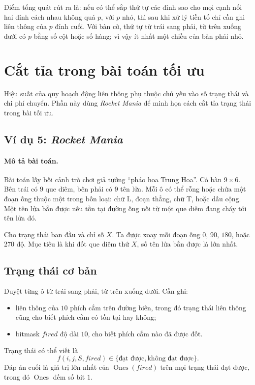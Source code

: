 \documentclass[11pt]{article}
\begin{document}
Điểm tổng quát rút ra là: nếu có thể sắp thứ tự các đỉnh sao cho mọi cạnh nối
hai đỉnh cách nhau không quá \(p\), với \(p\) nhỏ, thì sau khi xử lý tiền tố
chỉ cần ghi liên thông của \(p\) đỉnh cuối. Với bàn cờ, thứ tự từ trái sang
phải, từ trên xuống dưới có \(p\) bằng số cột hoặc số hàng; vì vậy ít nhất một
chiều của bàn phải nhỏ.

\section{Cắt tỉa trong bài toán tối ưu}

Hiệu suất của quy hoạch động liên thông phụ thuộc chủ yếu vào số trạng thái và
chi phí chuyển. Phần này dùng \textit{Rocket Mania} để minh họa cách cắt tỉa
trạng thái trong bài tối ưu.

\subsection{Ví dụ 5: \textit{Rocket Mania}}

\paragraph{Mô tả bài toán.}
Bài toán lấy bối cảnh trò chơi giả tưởng ``pháo hoa Trung Hoa''. Có bàn
\(9\times6\). Bên trái có \(9\) que diêm, bên phải có \(9\) tên lửa. Mỗi ô có
thể rỗng hoặc chứa một đoạn ống thuộc một trong bốn loại: chữ L, đoạn thẳng,
chữ T, hoặc dấu cộng. Một tên lửa bắn được nếu tồn tại đường ống nối từ một
que diêm đang cháy tới tên lửa đó.

Cho trạng thái ban đầu và chỉ số \(X\). Ta được xoay mỗi đoạn ống \(0\),
\(90\), \(180\), hoặc \(270\) độ. Mục tiêu là khi đốt que diêm thứ \(X\), số
tên lửa bắn được là lớn nhất.

\subsection{Trạng thái cơ bản}

Duyệt từng ô từ trái sang phải, từ trên xuống dưới. Cần ghi:
\begin{itemize}
  \item liên thông của \(10\) phích cắm trên đường biên, trong đó trạng thái
  liên thông cũng cho biết phích cắm có tồn tại hay không;
  \item bitmask \(fired\) độ dài \(10\), cho biết phích cắm nào đã được đốt.
\end{itemize}
Trạng thái có thể viết là
\[
  f(i,j,S,fired)\in\{\text{đạt được},\text{không đạt được}\}.
\]
Đáp án cuối là giá trị lớn nhất của \(\operatorname{Ones}(fired)\) trên mọi
trạng thái đạt được, trong đó \(\operatorname{Ones}\) đếm số bit \(1\).
\end{document}
